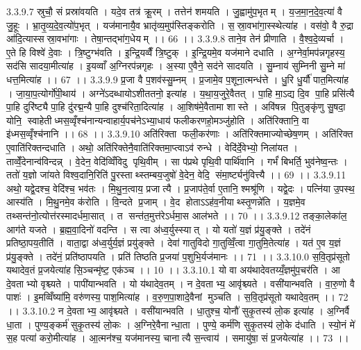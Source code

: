 3.3.9.7
स्रुचौ॒ सं प्रस्रा॑वयति । यदे॒व तत्र॑ क्रू॒रम् । तत्तेन॑ शमयति । जु॒ह्वामु॑प॒भृतम् । य॒ज॒मा॒न॒दे॒व॒त्या॑ वै जु॒हूः । भ्रा॒तृ॒व्य॒दे॒व॒त्यो॑प॒भृत् । यज॑मानायै॒व भ्रातृ॑व्य॒मुप॑स्तिङ्करोति । स॒॒स्रा॒वभा॑गा॒स्स्थेत्या॑ह । वस॑वो॒ वै रु॒द्रा आ॑दि॒त्यास्स॑स्रा॒वभा॑गाः । तेषा॒न्तद्भा॑ग॒धेयम् ।। 66 ।।
3.3.9.8
ताने॒व तेन॑ प्रीणाति । वै॒श्व॒दे॒व्यर्चा । ए॒ते हि विश्वे॑ दे॒वाः । त्रि॒ष्टुग्भ॑वति । इ॒न्द्रि॒यव्वैँ त्रि॒ष्टुक् । इ॒न्द्रि॒यमे॒व यज॑माने दधाति । अ॒ग्नेर्वा॒मप॑न्नगृहस्य॒ सद॑सि सादया॒मीत्या॑ह । इ॒यव्वाँ अ॒ग्निरप॑न्नगृहः । अ॒स्या ए॒वैने॒ सद॑ने सादयति । सु॒म्नाय॑ सुम्निनी सु॒म्ने मा॑ धत्त॒मित्या॑ह ।। 67 ।।
3.3.9.9
प्र॒जा वै प॒शव॑स्सु॒म्नम् । प्र॒जामे॒व प॒शूना॒त्मन्ध॑त्ते । धु॒रि धु॒र्यौ॑ पात॒मित्या॑ह । जा॒या॒प॒त्योर्गो॑पी॒थाय॑ । अग्ने॑ऽदब्धायोऽशीततनो॒ इत्या॑ह । य॒था॒य॒जुरे॒वैतत् । पा॒हि मा॒ऽद्य दि॒व पा॒हि प्रसि॑त्यै पा॒हि दुरि॑ष्ट्यै पा॒हि दु॑रद्म॒न्यै पा॒हि दुश्च॑रिता॒दित्या॑ह । आ॒शिष॑मे॒वैतामा शास्ते । अवि॑षन्न पि॒तुङ्कृ॑णु सु॒षदा॒ योनि॒॒ स्वाहेतीध्मस॒व्वृँश्च॑नान्यन्वाहार्य॒पच॑नेऽभ्या॒धाय॑ फलीकरणहो॒मञ्जु॑होति । अति॑रिक्तानि॒ वा इ॑ध्मस॒व्वृँश्च॑नानि ।। 68 ।।
3.3.9.10
अति॑रिक्ता फली॒कर॑णाः । अति॑रिक्तमाज्योच्छेष॒णम् । अति॑रिक्त ए॒वाति॑रिक्तन्दधाति । अथो॒ अति॑रिक्तेनै॒वाति॑रिक्तमा॒प्त्वाऽव॑ रुन्धे । वेदि॑र्दे॒वेभ्यो॒ निला॑यत । ताव्वेँ॒देनान्व॑विन्दन्न् । वे॒देन॒ वेदि॑व्विँविदु पृथि॒वीम् । सा प॑प्रथे पृथि॒वी पार्थि॑वानि । गर्भं॑ बिभर्ति॒ भुव॑नेष्व॒न्तः । ततो॑ य॒ज्ञो जा॑यते विश्व॒दानि॒रिति॑ पु॒रस्ताथ्स्तम्बय॒जुषो॑ वे॒देन॒ वेदि॒॒ संमा॒र्ष्ट्यनु॑वित्त्यै ।। 69 ।।
3.3.9.11
अथो॒ यद्वे॒दश्च॒ वेदि॑श्च॒ भव॑तः । मि॒थु॒न॒त्वाय॒ प्रजात्यै । प्र॒जाप॑ते॒र्वा ए॒तानि॒ श्मश्रू॑णि । यद्वे॒दः । पत्नि॑या उ॒पस्थ॒ आस्य॑ति । मि॒थु॒नमे॒व क॑रोति । वि॒न्दते प्र॒जाम् । वे॒द होताऽऽह॑व॒नीयाथ्स्तृ॒णन्ने॑ति । य॒ज्ञमे॒व तथ्सन्त॑नो॒त्योत्त॑रस्मादर्धमा॒सात् । त सन्त॑त॒मुत्त॑रेऽर्धमा॒स आल॑भते ।। 70 ।।
3.3.9.12
तङ्का॒लेका॑ल॒ आग॑ते यजते । ब्र॒ह्म॒वा॒दिनो॑ वदन्ति । स त्वा अ॑ध्व॒र्युस्स्यात् । यो यतो॑ य॒ज्ञं प्र॑यु॒ङ्क्ते । तदे॑नं प्रतिष्ठा॒पय॒तीति॑ । वाता॒द्वा अ॑ध्व॒र्युर्य॒ज्ञं प्रयु॑ङ्क्ते । देवा॑ गातुविदो गा॒तुव्विँ॒त्वा गा॒तुमि॒तेत्या॑ह । यत॑ ए॒व य॒ज्ञं प्र॑यु॒ङ्क्ते । तदे॑नं॒ प्रति॑ष्ठापयति । प्रति॑ तिष्ठति प्र॒जया॑ प॒शुभि॒र्यज॑मानः ।। 71 ।।
3.3.10.0
स॒वि॒तृप्र॑सूतो यथादेव॒तं प्र॒जयेत्या॑ह सि॒ञ्चन्मृ॑ष्ट॒ एक॑ञ्च ।। 10 ।।
3.3.10.1
यो वा अय॑थादेवतय्यँ॒ज्ञमु॑प॒चर॑ति । आ दे॒वताभ्यो वृश्च्यते । पापी॑यान्भवति । यो य॑थादेव॒तम् । न दे॒वताभ्य॒ आवृ॑श्च्यते । वसी॑यान्भवति । वा॒रु॒णो वै पाशः॑ । इ॒मव्विँष्या॑मि॒ वरु॑णस्य॒ पाश॒मित्या॑ह । व॒रु॒ण॒पा॒शादे॒वैनां मुञ्चति । स॒वि॒तृप्र॑सूतो यथादेव॒तम् ।। 72 ।।
3.3.10.2
न दे॒वताभ्य॒ आवृ॑श्च्यते । वसी॑यान्भवति । धा॒तुश्च॒ योनौ॑ सुकृ॒तस्य॑ लो॒क इत्या॑ह । अ॒ग्निर्वै धा॒ता । पुण्य॒ङ्कर्म॑ सुकृ॒तस्य॑ लो॒कः । अ॒ग्निरे॒वैनान्धा॒ता । पुण्ये॒ कर्म॑णि सुकृ॒तस्य॑ लो॒के द॑धाति । स्यो॒नं मे॑ स॒ह पत्या॑ करो॒मीत्या॑ह । आ॒त्मन॑श्च॒ यज॑मानस्य॒ चानात्यै स॒न्त्वाय॑ । समायु॑षा॒ सं प्र॒जयेत्या॑ह ।। 73 ।।
